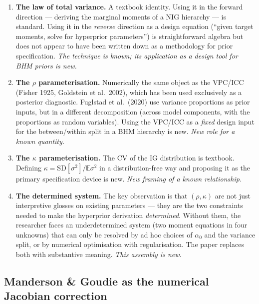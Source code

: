 \documentclass[12pt,a4paper]{article}
\newcommand{\E}{\mathbb{E}}
\newcommand{\SD}{\mathrm{SD}}
\begin{document}
\begin{enumerate}
  \item \textbf{The law of total variance.} A textbook identity. Using it in the
    forward direction --- deriving the marginal moments of a NIG hierarchy ---
    is standard. Using it in the \emph{reverse} direction as a design equation
    (``given target moments, solve for hyperprior parameters'') is
    straightforward algebra but does not appear to have been written down as a
    methodology for prior specification. \emph{The technique is known; its
    application as a design tool for BHM priors is new.}

  \item \textbf{The $\rho$ parameterisation.} Numerically the same object as the
    VPC/ICC (Fisher 1925, Goldstein et al.\ 2002), which has been used
    exclusively as a posterior diagnostic. Fuglstad et al.\ (2020) use variance
    proportions as prior inputs, but in a different decomposition (across model
    components, with the proportions as random variables). Using the VPC/ICC as
    a \emph{fixed} design input for the between/within split in a BHM hierarchy
    is new. \emph{New role for a known quantity.}

  \item \textbf{The $\kappa$ parameterisation.} The CV of the IG distribution is
    textbook. Defining $\kappa = \SD[\sigma^2]/\E{\sigma^2}$ in a
    distribution-free way and proposing it as the primary specification device
    is new. \emph{New framing of a known relationship.}

  \item \textbf{The determined system.} The key observation is that $(\rho,
    \kappa)$ are not just interpretive glosses on existing parameters --- they
    are the two constraints needed to make the hyperprior derivation
    \emph{determined}. Without them, the researcher faces an underdetermined
    system (two moment equations in four unknowns) that can only be resolved by
    ad hoc choices of $\alpha_0$ and the variance split, or by numerical
    optimisation with regularisation. The paper replaces both with substantive
    meaning. \emph{This assembly is new.}
\end{enumerate}

\subsection{Manderson \& Goudie as the numerical Jacobian correction}
\end{document}
